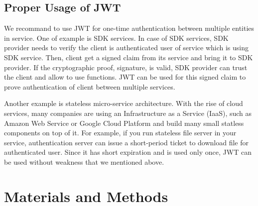 \documentclass[journal,article,submit,moreauthors,pdftex,10pt,a4paper]{mdpi}
\begin{document}
\subsection{Proper Usage of JWT}
We recommand to use JWT for one-time authentication between multiple entities in service. One of example is SDK services. In case of SDK services, SDK provider needs to verify the client is authenticated user of service which is using SDK service. Then, client get a signed claim from its service and bring it to SDK provider. If the cryptographic proof, signature, is valid, SDK provider can trust the client and allow to use functions. JWT can be used for this signed claim to prove authentication of client between multiple services.

Another example is stateless micro-service architecture. With the rise of cloud services, many companies are using an Infrastructure as a Service (IaaS), such as Amazon Web Service or Google Cloud Platform and build many small statless components on top of it. For example, if you run stateless file server in your service, authentication server can issue a short-period ticket to download file for authenticated user. Since it has short expiration and is used only once, JWT can be used without weakness that we mentioned above.

\section{Materials and Methods}


\end{document}
